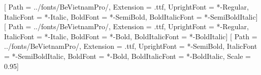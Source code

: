 
\usepackage{fontspec}
\setmainfont{BeVietnamPro}[
  Path = ../fonts/BeVietnamPro/, Extension = .ttf,
  UprightFont = *-Regular, ItalicFont = *-Italic,
  BoldFont = *-SemiBold, BoldItalicFont = *-SemiBoldItalic]
\setsansfont{BeVietnamPro}[
  Path = ../fonts/BeVietnamPro/, Extension = .ttf,
  UprightFont = *-Regular, ItalicFont = *-Italic,
  BoldFont = *-Bold, BoldItalicFont = *-BoldItalic]
\setmonofont{BeVietnamPro}[
  Path = ../fonts/BeVietnamPro/, Extension = .ttf,
  UprightFont = *-SemiBold, ItalicFont = *-SemiBoldItalic,
  BoldFont = *-Bold, BoldItalicFont = *-BoldItalic, Scale = 0.95]

\usepackage{graphicx}
\usepackage[most]{tcolorbox}
\usepackage{tabularx}
\usepackage{array}
\usepackage{qrcode}
\usepackage{fancyhdr}
\usepackage{lastpage}
\usepackage{enumitem}
\setlength{\parskip}{0.4em}
\setlength{\parindent}{0pt}
\frenchspacing

\makeatletter
\renewcommand{\sectionlinesformat}[4]{%
  \Ifstr{#1}{section}{%
    \parbox[t]{\linewidth}{\raggedsection\@hangfrom{\hskip #2#3}{#4}\par
      \vspace{-0.5ex}{\color{jdsecondary}\rule{\linewidth}{1pt}}}%
  }{\@hangfrom{\hskip #2#3}{#4}}%
}
\makeatother

\let\jdorigtexttt\texttt
\renewcommand{\texttt}[1]{%
  \tcbox[on line, colback=jdprimary!7, colframe=jdprimary!7, boxrule=0pt,
    arc=1mm, left=1mm, right=1mm, top=0.2mm, bottom=0.2mm, boxsep=0pt]{%
    \jdorigtexttt{\color{jdprimary}#1}}}

